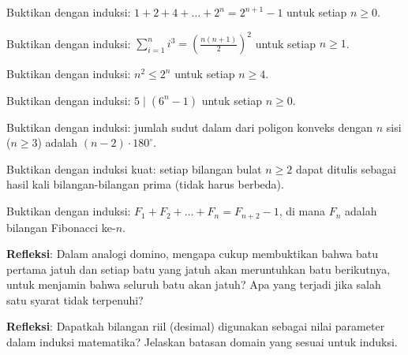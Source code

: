\documentclass[../main]{subfiles}
\begin{document}

\begin{latihan}
  \item Buktikan dengan induksi: $1 + 2 + 4 + \ldots + 2^n = 2^{n+1} - 1$ untuk setiap $n \geq 0$.
  \item Buktikan dengan induksi: $\displaystyle\sum_{i=1}^{n} i^3 = \left(\frac{n(n+1)}{2}\right)^2$ untuk setiap $n \geq 1$.
  \item Buktikan dengan induksi: $n^2 \leq 2^n$ untuk setiap $n \geq 4$.
  \item Buktikan dengan induksi: $5 \mid (6^n - 1)$ untuk setiap $n \geq 0$.
  \item Buktikan dengan induksi: jumlah sudut dalam dari poligon konveks dengan $n$ sisi ($n \geq 3$) adalah $(n-2) \cdot 180^\circ$.
  \item Buktikan dengan induksi kuat: setiap bilangan bulat $n \geq 2$ dapat ditulis sebagai hasil kali bilangan-bilangan prima (tidak harus berbeda).
  \item Buktikan dengan induksi: $F_1 + F_2 + \ldots + F_n = F_{n+2} - 1$, di mana $F_n$ adalah bilangan Fibonacci ke-$n$.
  \item \textbf{Refleksi}: Dalam analogi domino, mengapa cukup membuktikan bahwa batu pertama jatuh dan setiap batu yang jatuh akan meruntuhkan batu berikutnya, untuk menjamin bahwa seluruh batu akan jatuh? Apa yang terjadi jika salah satu syarat tidak terpenuhi?
  \item \textbf{Refleksi}: Dapatkah bilangan riil (desimal) digunakan sebagai nilai parameter dalam induksi matematika? Jelaskan batasan domain yang sesuai untuk induksi.
\end{latihan}

\end{document}

